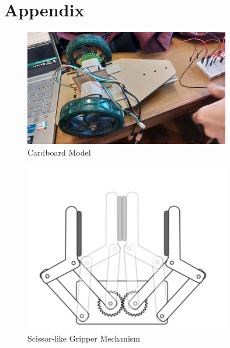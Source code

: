 \documentclass{article}
\begin{document}
\section{Appendix}
\begin{figure}[!h]
    \centering
    \includegraphics[width=0.8\textwidth]{assets/Cardboard_model.jpg}
    \caption{Cardboard Model}
    \label{fig:cardboard_model}
\end{figure}

\begin{figure}[!h]
    \centering
    \includegraphics[width=0.8\textwidth]{assets/Gripper_Mechanism.jpg}
    \caption{Scissor-like Gripper Mechanism}
    \label{fig:grip_mech}
\end{figure}
\end{document}
